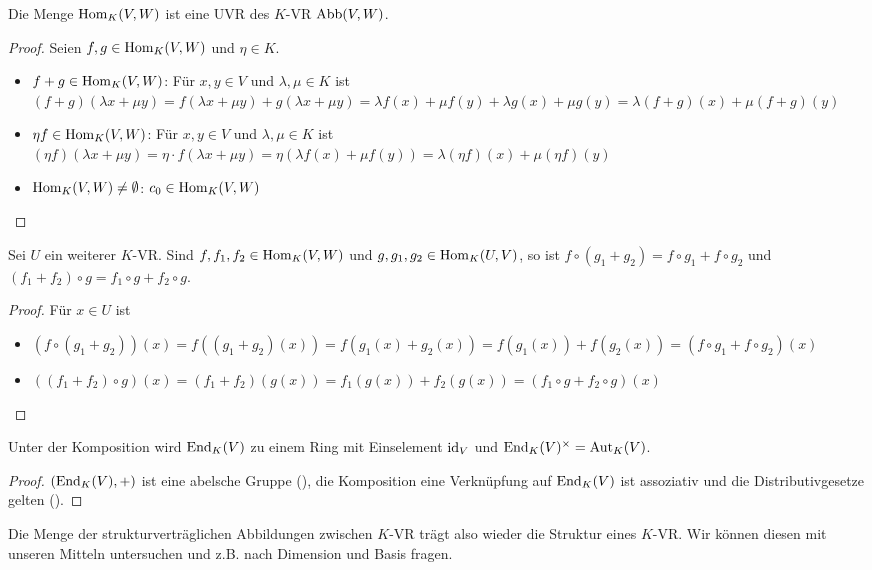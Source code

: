 \begin{proposition}
	Die Menge $\operatorname{Hom}_K(V,W)$ ist eine UVR des $K$-VR $\operatorname{Abb}(V,W)$.
\end{proposition}
\begin{proof}
	Seien $f,g\in \operatorname{Hom}_K(V,W)$ und $\eta \in K$.
	\begin{itemize}
		\item $f+g\in \operatorname{Hom}_K(V,W)$: Für $x,y\in V$ und $\lambda,\mu\in K$ ist $(f+g)(\lambda x+\mu y)=f(\lambda x+\mu y)+
		g(\lambda x+\mu y)=\lambda f(x)+\mu f(y)+\lambda g(x)+\mu g(y)=\lambda(f+g)(x)+\mu(f+g)(y)$
		\item $\eta f\in \operatorname{Hom}_K(V,W)$: Für $x,y\in V$ und $\lambda,\mu\in K$ ist $(\eta f)(\lambda x+\mu y)=\eta\cdot 
		f(\lambda x+\mu y)=\eta(\lambda f(x)+\mu f(y))=\lambda(\eta f)(x)+\mu(\eta f)(y)$
		\item $\operatorname{Hom}_K(V,W)\neq\emptyset$: $c_0\in \operatorname{Hom}_K(V,W)$
	\end{itemize}
\end{proof}

\begin{lemma}
	Sei $U$ ein weiterer $K$-VR. Sind $f,f_1,f_2\in \operatorname{Hom}_K(V,W)$ und $g,g_1,g_2\in \operatorname{Hom}_K(U,V)$, so ist 
	$f\circ (g_1+g_2)=f\circ g_1+f\circ g_2$ und $(f_1+f_2)\circ g=f_1\circ g+f_2\circ g$.
\end{lemma}
\begin{proof}
	Für $x\in U$ ist
	\begin{itemize}
		\item $(f\circ(g_1+g_2))(x)=f((g_1+g_2)(x))=f(g_1(x)+g_2(x))=f(g_1(x))+f(g_2(x))=(f\circ g_1+f\circ g_2)(x)$
		\item $((f_1+f_2)\circ g)(x)=(f_1+f_2)(g(x))=f_1(g(x))+f_2(g(x))=(f_1\circ g+f_2\circ g)(x)$
	\end{itemize}
\end{proof}

\begin{conclusion}
	Unter der Komposition wird $\operatorname{End}_K(V)$ zu einem Ring mit Einselement $\operatorname{id}_V$ und $\operatorname{End}_K(V)^{\times}=
	\operatorname{Aut}_K(V)$.
\end{conclusion}
\begin{proof}
	$(\operatorname{End}_K(V),+)$ ist eine abelsche Gruppe (), die Komposition eine Verknüpfung auf $\operatorname{End}_K(V)$ ist assoziativ und die 
	Distributivgesetze gelten ().
\end{proof}

\begin{remark}
	Die Menge der strukturverträglichen Abbildungen zwischen $K$-VR trägt also wieder die Struktur 
	eines $K$-VR. Wir können diesen mit unseren Mitteln untersuchen und z.B. nach Dimension und Basis fragen.
\end{remark}

